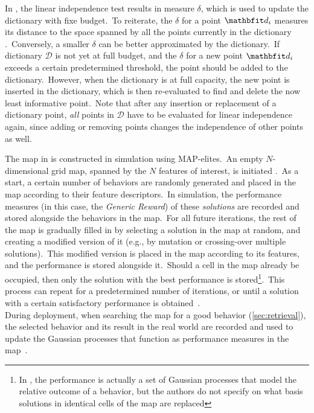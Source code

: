 In \textcite{Nguyen2011}, the linear independence test results in measure $\delta$, which is used to update the dictionary with fixe budget.\ To reiterate, the $\delta$ for a point $\bvec{d}_i$ measures its distance to the space spanned by all the points currently in the dictionary .\ Conversely, a smaller $\delta$ can be better approximated by the dictionary.\ If dictionary $\mathcal{D}$ is not yet at full budget, and the $\delta$ for a new point $\bvec{d}_i$ exceeds a certain predetermined threshold, the point should be added to the dictionary.\ However, when the dictionary is at full capacity, the new point is inserted in the dictionary, which is then re-evaluated to find and delete the now least informative point.\ Note that after any insertion or replacement of a dictionary point, \emph{all} points in $\mathcal{D}$ have to be evaluated for linear independence again, since adding or removing points changes the independence of other points as well.

The map in \textcite{Chatzilygeroudis2016} is constructed in simulation using MAP-elites.\ An empty $N$-dimensional grid map, spanned by the $N$ features of interest, is initiated .\ As a start, a certain number of behaviors are randomly generated and placed in the map according to their feature descriptors.\ In simulation, the performance measures (in this case, the \emph{Generic Reward}) of these \emph{solutions} are recorded and stored alongside the behaviors in the map.\ For all future iterations, the rest of the map is gradually filled in by selecting a solution in the map at random, and creating a modified version of it (e.g., by mutation or crossing-over multiple solutions).\ This modified version is placed in the map according to its features, and the performance is stored alongside it.\ Should a cell in the map already be occupied, then only the solution with the best performance is stored\footnote{In \textcite{Chatzilygeroudis2016}, the performance is actually a set of Gaussian processes that model the relative outcome of a behavior, but the authors do not specify on what basis solutions in identical cells of the map are replaced}.\ This process can repeat for a predetermined number of iterations, or until a solution with a certain satisfactory performance is obtained~\cite{Mouret2015}.\\
During deployment, when searching the map for a good behavior (\cref{sec:retrieval}), the selected behavior and its result in the real world are recorded and used to update the Gaussian processes that function as performance measures in the map~\cite{Chatzilygeroudis2016}.

